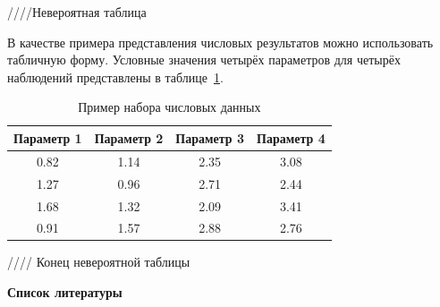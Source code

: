 \documentclass[12pt,a4paper]{article}
\begin{document}
////Невероятная таблица

\vspace{0.5cm}

В качестве примера представления числовых результатов можно использовать
табличную форму. Условные значения четырёх параметров для четырёх наблюдений
представлены в таблице~\ref{tab:example_data}.

\begin{table}[H]
    \caption{Пример набора числовых данных}
    \label{tab:example_data}

    \centering
    \begin{tabular}{|c|c|c|c|}
        \hline
        Параметр 1 & Параметр 2 & Параметр 3 & Параметр 4 \\
        \hline
        0.82 & 1.14 & 2.35 & 3.08 \\
        \hline
        1.27 & 0.96 & 2.71 & 2.44 \\
        \hline
        1.68 & 1.32 & 2.09 & 3.41 \\
        \hline
        0.91 & 1.57 & 2.88 & 2.76 \\
        \hline
    \end{tabular}
\end{table}

//// Конец невероятной таблицы

\bigskip

\noindent\textbf{Список литературы}

\begingroup
\sloppy
\printbibliography[heading=none]
\endgroup
\end{document}
